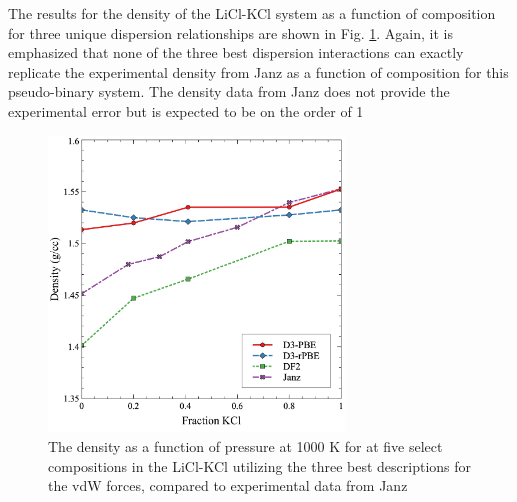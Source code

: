 \documentclass[review]{elsarticle}
\begin{document}
The results for the density of the LiCl-KCl system as a function of composition for three unique dispersion relationships are shown in Fig. \ref{fig:disp_tot}. Again, it is emphasized that none of the three best dispersion interactions can exactly replicate the experimental density from Janz as a function of composition for this pseudo-binary system. The density data from Janz does not provide the experimental error but is expected to be on the order of 1%

\begin{figure}[h]
 \centering
 \includegraphics[width=0.7\textwidth]{images/final_disp.jpg} 
 \caption{The density as a function of pressure at 1000 K for at five select compositions in the LiCl-KCl utilizing the three best descriptions for the vdW forces, compared to experimental data from Janz \cite{janz1975molten,van1955electrical}}
 \label{fig:disp_tot}
\end{figure} 
\end{document}

